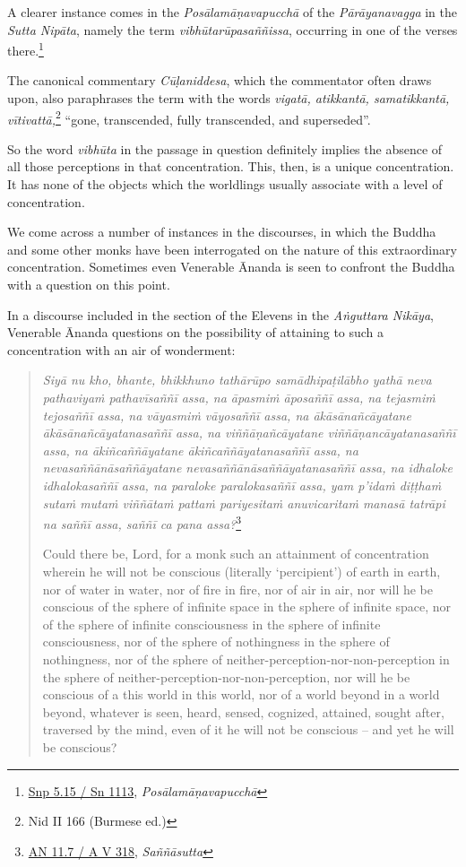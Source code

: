 A clearer instance comes in the \emph{Posālamāṇavapucchā} of the \emph{Pārāyanavagga} in the \emph{Sutta Nipāta}, namely the term \emph{vibhūtarūpasaññissa}, occurring in one of the verses there.\footnote{\href{https://suttacentral.net/snp5.15/pli/ms}{Snp 5.15 / Sn 1113}, \emph{Posālamāṇavapucchā}}

The canonical commentary \emph{Cūḷaniddesa}, which the commentator often draws upon, also paraphrases the term with the words \emph{vigatā, atikkantā, samatikkantā, vītivattā,}\footnote{Nid II 166 (Burmese ed.)} ``gone, transcended, fully transcended, and superseded''.

So the word \emph{vibhūta} in the passage in question definitely implies the absence of all those perceptions in that concentration. This, then, is a unique concentration. It has none of the objects which the worldlings usually associate with a level of concentration.

We come across a number of instances in the discourses, in which the Buddha and some other monks have been interrogated on the nature of this extraordinary concentration. Sometimes even Venerable Ānanda is seen to confront the Buddha with a question on this point.

In a discourse included in the section of the Elevens in the \emph{Aṅguttara Nikāya}, Venerable Ānanda questions on the possibility of attaining to such a concentration with an air of wonderment:

\begin{quote}
\emph{Siyā nu kho, bhante, bhikkhuno tathārūpo samādhipaṭilābho yathā neva pathaviyaṁ pathavīsaññī assa, na āpasmiṁ āposaññī assa, na tejasmiṁ tejosaññī assa, na vāyasmiṁ vāyosaññī assa, na ākāsānañcāyatane ākāsānañcāyatanasaññī assa, na viññāṇañcāyatane viññāṇancāyatanasaññī assa, na ākiñcaññāyatane ākiñcaññāyatanasaññī assa, na nevasaññānāsaññāyatane nevasaññānāsaññāyatanasaññī assa, na idhaloke idhalokasaññī assa, na paraloke paralokasaññī assa, yam p'idaṁ diṭṭhaṁ sutaṁ mutaṁ viññātaṁ pattaṁ pariyesitaṁ anuvicaritaṁ manasā tatrāpi na saññī assa, saññī ca pana assa?}\footnote{\href{https://suttacentral.net/an11.7/pli/ms}{AN 11.7 / A V 318}, \emph{Saññāsutta}}

Could there be, Lord, for a monk such an attainment of concentration wherein he will not be conscious (literally `percipient') of earth in earth, nor of water in water, nor of fire in fire, nor of air in air, nor will he be conscious of the sphere of infinite space in the sphere of infinite space, nor of the sphere of infinite consciousness in the sphere of infinite consciousness, nor of the sphere of nothingness in the sphere of nothingness, nor of the sphere of neither-perception-nor-non-perception in the sphere of neither-perception-nor-non-perception, nor will he be conscious of a this world in this world, nor of a world beyond in a world beyond, whatever is seen, heard, sensed, cognized, attained, sought after, traversed by the mind, even of it he will not be conscious -- and yet he will be conscious?
\end{quote}

